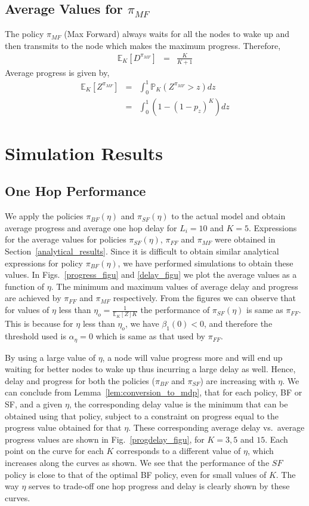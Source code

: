 \documentclass[onecolumn]{IEEEtran}
\begin{document}
\subsection{Average Values for $\pi_{MF}$}
The policy $\pi_{MF}$ (Max Forward) always waits for all the nodes to wake up and then transmits to the node which makes the maximum progress. Therefore,
\begin{eqnarray}
	\mathbb{E}_K[D^{\pi_{MF}}]&=& \frac{K}{K+1}
\end{eqnarray}
Average progress is given by, 
\begin{eqnarray}
	\mathbb{E}_K[Z^{\pi_{MF}}]&=&\int_0^1\mathbb{P}_K(Z^{\pi_{MF}}>z)dz\nonumber\\
	&=&\int_0^1 \left(1-{(1-p_z)}^K\right) dz
\end{eqnarray}
\section{Simulation Results}
\label{simulation_results}
\subsection{One Hop Performance}
We apply the policies $\pi_{BF}(\eta)$ and $\pi_{SF}(\eta)$ to the
actual model and obtain average progress and average one hop delay for
$L_i=10$ and $K=5$. Expressions for the average values for policies
$\pi_{SF}(\eta)$, $\pi_{FF}$ and $\pi_{MF}$ were obtained in Section~\ref{analytical_results}.
 Since it is
difficult to obtain similar analytical expressions for policy
$\pi_{BF}(\eta)$, we have performed simulations to obtain these
values.  In Figs.~\ref{progress_figu} and \ref{delay_figu} we plot
the average values as a function of $\eta$.  The minimum and maximum
values of average delay and progress are achieved by $\pi_{FF}$ and
$\pi_{MF}$ respectively. From the figures we can observe that for
values of $\eta$ less than $\eta_o=\frac{1}{\mathbb{E}_{K}[Z]K}$ the
performance of $\pi_{SF}(\eta)$ is same as $\pi_{FF}$. This is because
for $\eta$ less than $\eta_o$, we have $\beta_1(0)<0$, and therefore
the threshold used is $\alpha_\eta=0$ which is same as that used by
$\pi_{FF}$.

By using a large value of $\eta$, a node will value progress more and
will end up waiting for better nodes to wake up thus incurring a large
delay as well. Hence, delay and progress for both the policies
($\pi_{BF}$ and $\pi_{SF}$) are increasing with $\eta$. We can
conclude from Lemma~\ref{lem:conversion_to_mdp}, that for each policy,
BF or SF, and a given $\eta$, the corresponding delay value is the
minimum that can be obtained using that policy, subject to a
constraint on progress equal to the progress value obtained for that
$\eta$.  These corresponding average delay vs.\ average progress values are shown in
Fig.~\ref{progdelay_figu}, for $K=3, 5 $ and $15$.  Each point on the
curve for each $K$ corresponds to a different value of $\eta$, which
increases along the curves as shown.  We see that the performance of
the $SF$ policy is close to that of the optimal BF policy, even for
small values of $K$. The way $\eta$ serves to trade-off one hop
progress and delay is clearly shown by these curves.
\end{document}
